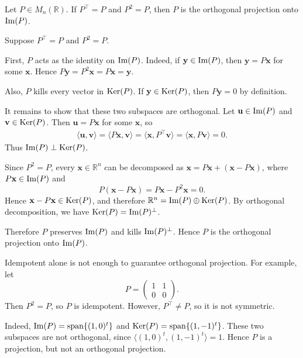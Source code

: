 \begin{theorem}
Let $P\in M_n(\mathbb{R})$. If $P^\top=P$ and $P^2=P$, then $P$ is the
orthogonal projection onto $\operatorname{Im}(P)$.
\end{theorem}

\begin{pfbox}
Suppose $P^\top=P$ and $P^2=P$.

First, $P$ acts as the identity on $\operatorname{Im}(P)$. Indeed, if
$\mathbf{y}\in\operatorname{Im}(P)$, then $\mathbf{y}=P\mathbf{x}$ for some $\mathbf{x}$.
Hence $P\mathbf{y}=P^2\mathbf{x}=P\mathbf{x}=\mathbf{y}$.

Also, $P$ kills every vector in $\operatorname{Ker}(P)$. If $\mathbf{y}\in\operatorname{Ker}(P)$, then
$P\mathbf{y}=0$ by definition.

It remains to show that these two subspaces are orthogonal. Let
$\mathbf{u}\in\operatorname{Im}(P)$ and $\mathbf{v}\in\operatorname{Ker}(P)$. Then
$\mathbf{u}=P\mathbf{x}$ for some $\mathbf{x}$, so
\[
\begin{aligned}
    \langle \mathbf{u},\mathbf{v}\rangle=\langle P\mathbf{x},\mathbf{v}\rangle=\langle \mathbf{x},P^\top\mathbf{v}\rangle=\langle \mathbf{x},P\mathbf{v}\rangle=0.
\end{aligned}
\]
Thus $\operatorname{Im}(P)\perp\operatorname{Ker}(P)$.

Since $P^2=P$, every $\mathbf{x}\in\mathbb{R}^n$ can be decomposed as
$\mathbf{x}=P\mathbf{x}+(\mathbf{x}-P\mathbf{x})$, where
$P\mathbf{x}\in\operatorname{Im}(P)$ and
\[
    P(\mathbf{x}-P\mathbf{x})
    =
    P\mathbf{x}-P^2\mathbf{x}
    =
    0.
\]
Hence $\mathbf{x}-P\mathbf{x}\in\operatorname{Ker}(P)$, and therefore
$\mathbb{R}^n=\operatorname{Im}(P)\oplus\operatorname{Ker}(P)$. By orthogonal decomposition, we have
$\operatorname{Ker}(P)=\operatorname{Im}(P)^\perp$.

Therefore $P$ preserves $\operatorname{Im}(P)$ and kills $\operatorname{Im}(P)^\perp$. Hence $P$ is the
orthogonal projection onto $\operatorname{Im}(P)$.
\end{pfbox}

\begin{remark}
Idempotent alone is not enough to guarantee orthogonal projection. For example,
let
$$
P=
\begin{pmatrix}
    1 & 1\\
    0 & 0
\end{pmatrix}.
$$
Then $P^2=P$, so $P$ is idempotent. However, $P^\top\neq P$, so it is not
symmetric.

Indeed, $\operatorname{Im}(P)=\operatorname{span}\{(1,0)^t\}$ and
$\operatorname{Ker}(P)=\operatorname{span}\{(1,-1)^t\}$. These two subspaces are not
orthogonal, since $\langle (1,0)^t,(1,-1)^t\rangle=1$. Hence $P$ is a
projection, but not an orthogonal projection.
\end{remark}

